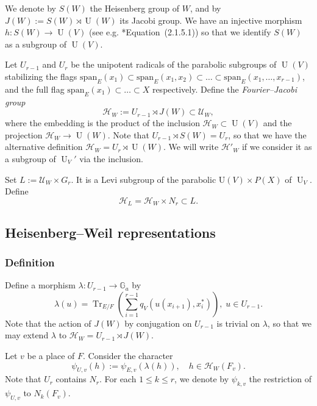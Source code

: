 \documentclass[letterpaper,11pt]{amsart}
\newcommand{\bG}{\mathbb{G}}
\newcommand{\cH}{\mathcal{H}}
\newcommand{\cU}{\mathcal{U}}
\newcommand{\<}{\negthickspace}
\DeclareMathOperator{\Tr}{Tr}
\DeclareMathOperator{\U}{U}
\theoremstyle{definition}
\theoremstyle{plain}
\theoremstyle{remark}
\numberwithin{equation}{section}
\begin{document}
We denote by $S(W)$ the Heisenberg group of $W$, and by $ J(W):=S(W) \rtimes \U(W)$ its Jacobi group. We have an injective morphism $h : S(W) \to \U(V)$ (see e.g. \cite{Boi}*{Equation~(2.1.5.1)}) so that we identify $S(W)$ as a subgroup of $\U(V)$. 

Let $U_{r-1}$ and $U_r$ be the unipotent radicals of the parabolic subgroups of $\U(V)$ stabilizing the flags $\mathrm{span}_E(x_1) \subset \mathrm{span}_E(x_1,x_2) \subset \hdots \subset \mathrm{span}_E(x_1,\hdots,x_{r-1})$, and the full flag $\mathrm{span}_E(x_1) \subset \hdots \subset X$ respectively. Define the \emph{Fourier--Jacobi group}
\begin{equation*}
    \cH_W:=U_{r-1} \rtimes J(W) \subset \cU_W,
\end{equation*}
where the embedding is the product of the inclusion $\cH_W \subset \U(V)$ and the projection $\cH_W \to \U(W)$. Note that $U_{r-1} \rtimes S(W)=U_r$, so that we have the alternative definition $\cH_W=U_r \rtimes \U(W)$. We will write $\cH'_W$ if we consider it as a subgroup of $\U_V'$ via the inclusion. 

Set $L:=\cU_W \times G_r$. It is a Levi subgroup of the parabolic $\mathrm{U}(V) \times P(X)$ of $\U_V$. Define
\begin{equation*}
    \cH_L=\cH_W \times N_r \subset L.
\end{equation*}

\subsection{Heisenberg--Weil representations}

\subsubsection{Definition}
Define a morphism $\lambda : U_{r-1} \to \bG_a$ by
\begin{equation}
\label{eq:lambda_N}
     \lambda(u)=\Tr_{E/F} \left(\sum_{i=1}^{r-1}  q_V(u(x_{i+1}),x_{i}^*) \right), \; u \in U_{r-1}.
\end{equation}
Note that the action of $J(W)$ by conjugation on $U_{r-1}$ is trivial on $\lambda$, so that we may extend $\lambda$ to $\cH_W=U_{r-1} \rtimes J(W)$.

Let $v$ be a place of $F$. Consider the character
\begin{equation}
\label{eq:psi_U}
    \psi_{U,v}(h):=\psi_{E,v} (\lambda(h)), \quad h \in \cH_W(F_v).
\end{equation}
Note that $U_r$ contains $N_r$. For each $1 \leq k \leq r$, we denote by $\psi_{k,v}$ the restriction of $\psi_{U,v}$ to $N_k(F_v)$. 
\end{document}
